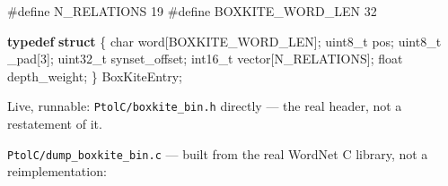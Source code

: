 \documentclass[
  10pt,
]{article}
\newenvironment{Shaded}{}{}
\newcommand{\DataTypeTok}[1]{\textcolor[rgb]{0.56,0.13,0.00}{#1}}
\newcommand{\DecValTok}[1]{\textcolor[rgb]{0.25,0.63,0.44}{#1}}
\newcommand{\KeywordTok}[1]{\textcolor[rgb]{0.00,0.44,0.13}{\textbf{#1}}}
\newcommand{\NormalTok}[1]{#1}
\newcommand{\OperatorTok}[1]{\textcolor[rgb]{0.40,0.40,0.40}{#1}}
\newcommand{\PreprocessorTok}[1]{\textcolor[rgb]{0.74,0.48,0.00}{#1}}
\begin{document}
\begin{Shaded}
\begin{Highlighting}[]
\PreprocessorTok{\#define N\_RELATIONS       }\DecValTok{19}
\PreprocessorTok{\#define BOXKITE\_WORD\_LEN  }\DecValTok{32}

\KeywordTok{typedef} \KeywordTok{struct} \OperatorTok{\{}
    \DataTypeTok{char}\NormalTok{     word}\OperatorTok{[}\NormalTok{BOXKITE\_WORD\_LEN}\OperatorTok{];}
    \DataTypeTok{uint8\_t}\NormalTok{  pos}\OperatorTok{;}
    \DataTypeTok{uint8\_t}\NormalTok{  \_pad}\OperatorTok{[}\DecValTok{3}\OperatorTok{];}
    \DataTypeTok{uint32\_t}\NormalTok{ synset\_offset}\OperatorTok{;}
    \DataTypeTok{int16\_t}\NormalTok{  vector}\OperatorTok{[}\NormalTok{N\_RELATIONS}\OperatorTok{];}
    \DataTypeTok{float}\NormalTok{    depth\_weight}\OperatorTok{;}
\OperatorTok{\}}\NormalTok{ BoxKiteEntry}\OperatorTok{;}
\end{Highlighting}
\end{Shaded}

Live, runnable: \texttt{PtolC/boxkite\_bin.h} directly --- the real
header, not a restatement of it.

\texttt{PtolC/dump\_boxkite\_bin.c} --- built from the real WordNet C
library, not a reimplementation:
\end{document}
